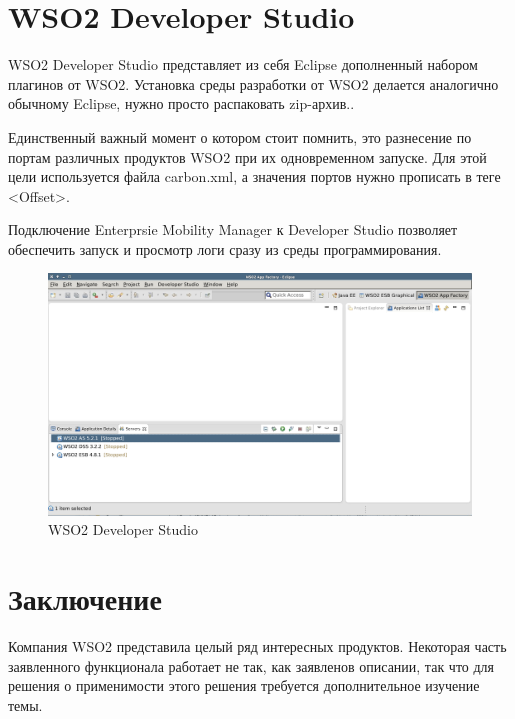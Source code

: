 \documentclass[a4paper, 12pt]{article}		%
\begin{document}
\section{WSO2 Developer Studio}

WSO2 Developer Studio представляет из себя Eclipse дополненный набором плагинов от WSO2. Установка среды разработки от WSO2 делается аналогично обычному Eclipse, нужно просто распаковать zip-архив..

Единственный важный момент о котором стоит помнить, это разнесение по портам различных продуктов WSO2 при их одновременном запуске. Для этой цели используется файла carbon.xml, а значения портов нужно прописать в теге <Offset>.

Подключение Enterprsie Mobility Manager к Developer Studio позволяет обеспечить запуск и просмотр логи сразу из среды программирования.

\begin{figure}[h!]
\centering
\includegraphics[scale=0.4]{res/DS001}
\caption{WSO2 Developer Studio}
\end{figure}

\section*{Заключение}

Компания WSO2 представила целый ряд интересных продуктов. Некоторая часть  заявленного функционала работает не так, как заявленов описании, так что для решения о применимости этого решения требуется дополнительное изучение темы.

\end{document}
